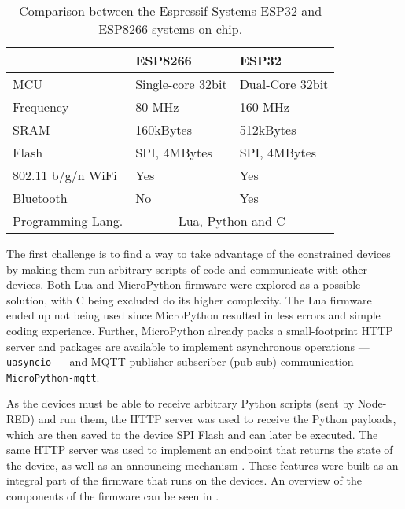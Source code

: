 \begin{table}[]
\centering
\begin{tabular}{@{}lll@{}}
\toprule
                   & \textbf{ESP8266}                   & \textbf{ESP32}                       \\ \midrule
MCU                & Single-core 32bit         & Dual-Core 32bit \\
Frequency          & 80 MHz                    & 160 MHz                     \\
SRAM               & 160kBytes                 & 512kBytes                   \\
Flash              & SPI, 4MBytes             & SPI, 4MBytes               \\
802.11 b/g/n WiFi  & Yes                       & Yes                         \\
Bluetooth          & No                        & Yes                         \\
Programming Lang.  & \multicolumn{2}{c}{Lua, Python and C} \\ \bottomrule
\end{tabular}
\caption{Comparison between the Espressif Systems ESP32 and ESP8266 systems on chip.}
\label{tab:esps}
\end{table}

The first challenge is to find a way to take advantage of the constrained devices by making them run arbitrary scripts of code and communicate with other devices. Both Lua and MicroPython firmware were explored as a possible solution, with C being excluded do its higher complexity. The Lua firmware ended up not being used since MicroPython resulted in less errors and simple coding experience. Further, MicroPython already packs a small-footprint HTTP server and packages are available to implement asynchronous operations --- \ie \texttt{uasyncio} --- and MQTT publisher-subscriber (\viz pub-sub) communication --- \ie \texttt{MicroPython-mqtt}.

As the devices must be able to receive arbitrary Python scripts (sent by Node-RED) and run them, the HTTP server was used to receive the Python payloads, which are then saved to the device SPI Flash and can later be executed. The same HTTP server was used to implement an endpoint that returns the state of the device, as well as an announcing mechanism . These features were built as an integral part of the firmware that runs on the devices. An overview of the components of the firmware can be seen in .

